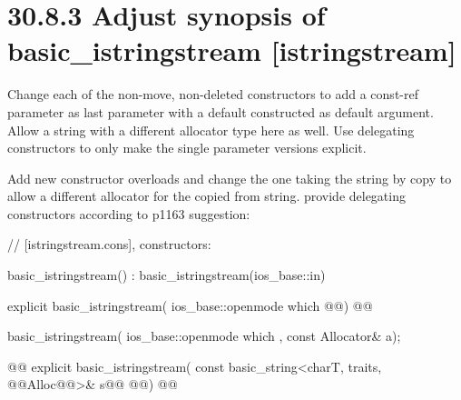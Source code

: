 \documentclass[ebook,11pt,article]{memoir}
\renewcommand{\iref}[1]{[#1]}
\begin{document}
\section{30.8.3 Adjust synopsis of basic\_istringstream [istringstream]}

\begin{em}
Change each of the non-move, non-deleted constructors to add a const-ref  parameter as last parameter with a default constructed  as default argument. Allow a string with a different allocator type here as well. Use delegating constructors to only make the single parameter versions explicit.
\end{em}

Add new constructor overloads and change the one taking the string by copy to allow a different allocator for the copied from string. provide delegating constructors according to p1163 suggestion:
\begin{codeblock}
    // \iref{istringstream.cons}, constructors:
\end{codeblock}
\begin{addedblock}\begin{codeblock}
    basic_istringstream() : basic_istringstream(ios_base::in){}
\end{codeblock}\end{addedblock}
\begin{codeblock}
    explicit basic_istringstream(
      ios_base::openmode which @@)
      @\removed{;}@
\end{codeblock}
\begin{addedblock}\begin{codeblock}
    basic_istringstream(
      ios_base::openmode which ,
      const Allocator& a);
\end{codeblock}\end{addedblock}
\begin{addedblock}\begin{codeblock}
\end{codeblock}\end{addedblock}
\begin{codeblock}      
    @@
    explicit basic_istringstream(
      const basic_string<charT, traits, @@Alloc@@>& s@\removed{,}@
      @@)
      @\removed{;}@
\end{codeblock}
\end{document}
